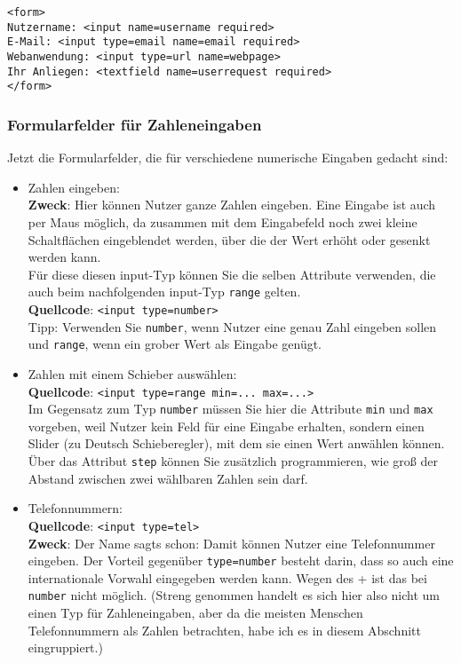 \begin{verbatim}
<form>
Nutzername: <input name=username required>
E-Mail: <input type=email name=email required>
Webanwendung: <input type=url name=webpage>
Ihr Anliegen: <textfield name=userrequest required>
</form>
\end{verbatim}

\subsubsection{Formularfelder für Zahleneingaben}

Jetzt die Formularfelder, die für verschiedene numerische Eingaben gedacht sind:

\begin{itemize}
	\item Zahlen eingeben:\\
	\textbf{Zweck}: Hier können Nutzer ganze Zahlen eingeben. Eine Eingabe ist auch per Maus möglich, da zusammen mit dem Eingabefeld noch zwei kleine Schaltflächen eingeblendet werden, über die der Wert erhöht oder gesenkt werden kann.\\	
	Für diese diesen input-Typ können Sie die selben Attribute verwenden, die auch beim nachfolgenden input-Typ \verb|range| gelten. \\	
	\textbf{Quellcode}: \verb|<input type=number>|\\
	Tipp: Verwenden Sie \verb|number|, wenn Nutzer eine genau Zahl eingeben sollen und \verb|range|, wenn ein grober Wert als Eingabe genügt.

	\item Zahlen mit einem Schieber auswählen:\\
	\textbf{Quellcode}: \verb|<input type=range min=... max=...>|\\
	Im Gegensatz zum Typ \verb|number| müssen Sie hier die Attribute \verb|min| und \verb|max| vorgeben, weil Nutzer kein Feld für eine Eingabe erhalten, sondern einen Slider (zu Deutsch Schieberegler), mit dem sie einen Wert anwählen können. Über das Attribut \verb|step| können Sie zusätzlich programmieren, wie groß der Abstand zwischen zwei wählbaren Zahlen sein darf.

	\item Telefonnummern:\\
	\textbf{Quellcode}: \verb|<input type=tel>|\\
	\textbf{Zweck}: Der Name sagts schon: Damit können Nutzer eine Telefonnummer eingeben. Der Vorteil gegenüber \verb|type=number| besteht darin, dass so auch eine internationale Vorwahl eingegeben werden kann. Wegen des + ist das bei \verb|number| nicht möglich. (Streng genommen handelt es sich hier also nicht um einen Typ für Zahleneingaben, aber da die meisten Menschen Telefonnummern als Zahlen betrachten, habe ich es in diesem Abschnitt eingruppiert.)
\end{itemize}

